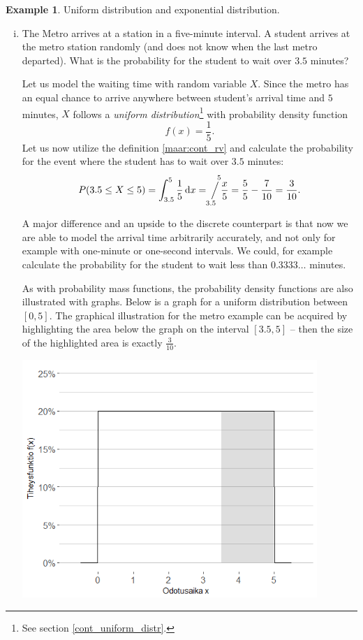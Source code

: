 \documentclass[12pt,a4paper,leqno]{report}
\newcommand{\dif}{\,\mathrm{d}}
\newcommand{\sijoitus}[2]{\mathop{\Big/}\limits_{\hspace{-0.85em}{#1}}^{\hspace{0.85em}{#2}}\hspace{-0.2em}}
\theoremstyle{plain}
\theoremstyle{definition}
\newtheorem{esim}[equation]{Example}
\begin{document}
\begin{esim}\label{esim:cont_rv1} 
Uniform distribution and exponential distribution.
\begin{enumerate}[(i)]
\item The Metro arrives at a station in a five-minute interval. A student arrives at the metro station randomly (and does not know when the last metro departed). What is the probability for the student to wait over $3.5$ minutes?

Let us model the waiting time with random variable $X$. Since the metro has an equal chance to arrive anywhere between student's arrival time and $5$ minutes, $X$ follows a \emph{uniform distribution}\footnote{See section \ref{cont_uniform_distr}.} with probability density function
\[
f(x) = \frac{1}{5}.
\] 
Let us now utilize the definition \ref{maar:cont_rv} and calculate the probability for the event where the student has to wait over $3.5$ minutes:
\[
P(3.5 \leq X \leq 5) = \int_{3.5}^5 \frac{1}{5}\dif{x} = \sijoitus{3.5}{5} \frac{x}{5} = \frac{5}{5} - \frac{7}{10} = \frac{3}{10}. 
\]

A major difference and an upside to the discrete counterpart is that now we are able to model the arrival time arbitrarily accurately, and not only for example with one-minute or one-second intervals. We could, for example calculate the probability for the student to wait less than $0.3333\ldots$ minutes.

As with probability mass functions, the probability density functions are also illustrated with graphs. Below is a graph for a uniform distribution between $[0,5]$. The graphical illustration for the metro example can be acquired by highlighting the area below the graph on the interval $[3.5,5]$ -- then the size of the highlighted area is exactly $\frac{3}{10}$.

\begin{center}
\includegraphics[height = 9cm]{metro.png}
\end{center}


\end{enumerate}
\end{esim}
\end{document}
